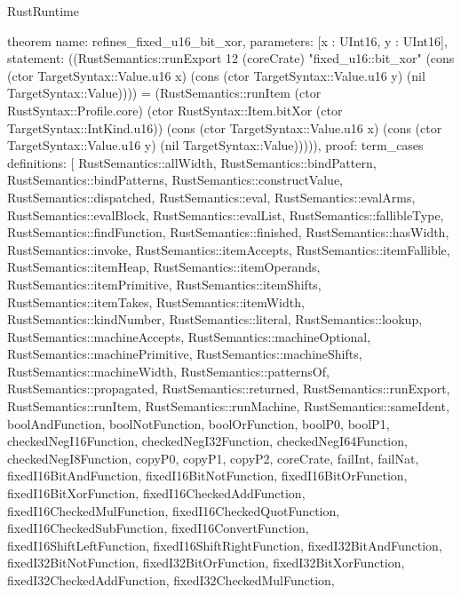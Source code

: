\begin{lexlean}{RustRuntime}
\begin{semanticmodule}
theorem{
  name: refines_fixed_u16_bit_xor,
  parameters: [x : UInt16, y : UInt16],
  statement: ((RustSemantics::runExport 12 (coreCrate) "fixed_u16::bit_xor" (cons (ctor TargetSyntax::Value.u16 x) (cons (ctor TargetSyntax::Value.u16 y) (nil TargetSyntax::Value)))) = (RustSemantics::runItem (ctor RustSyntax::Profile.core) (ctor RustSyntax::Item.bitXor (ctor TargetSyntax::IntKind.u16)) (cons (ctor TargetSyntax::Value.u16 x) (cons (ctor TargetSyntax::Value.u16 y) (nil TargetSyntax::Value))))),
  proof: term_cases{
    definitions: [
      RustSemantics::allWidth,
      RustSemantics::bindPattern,
      RustSemantics::bindPatterns,
      RustSemantics::constructValue,
      RustSemantics::dispatched,
      RustSemantics::eval,
      RustSemantics::evalArms,
      RustSemantics::evalBlock,
      RustSemantics::evalList,
      RustSemantics::fallibleType,
      RustSemantics::findFunction,
      RustSemantics::finished,
      RustSemantics::hasWidth,
      RustSemantics::invoke,
      RustSemantics::itemAccepts,
      RustSemantics::itemFallible,
      RustSemantics::itemHeap,
      RustSemantics::itemOperands,
      RustSemantics::itemPrimitive,
      RustSemantics::itemShifts,
      RustSemantics::itemTakes,
      RustSemantics::itemWidth,
      RustSemantics::kindNumber,
      RustSemantics::literal,
      RustSemantics::lookup,
      RustSemantics::machineAccepts,
      RustSemantics::machineOptional,
      RustSemantics::machinePrimitive,
      RustSemantics::machineShifts,
      RustSemantics::machineWidth,
      RustSemantics::patternsOf,
      RustSemantics::propagated,
      RustSemantics::returned,
      RustSemantics::runExport,
      RustSemantics::runItem,
      RustSemantics::runMachine,
      RustSemantics::sameIdent,
      boolAndFunction,
      boolNotFunction,
      boolOrFunction,
      boolP0,
      boolP1,
      checkedNegI16Function,
      checkedNegI32Function,
      checkedNegI64Function,
      checkedNegI8Function,
      copyP0,
      copyP1,
      copyP2,
      coreCrate,
      failInt,
      failNat,
      fixedI16BitAndFunction,
      fixedI16BitNotFunction,
      fixedI16BitOrFunction,
      fixedI16BitXorFunction,
      fixedI16CheckedAddFunction,
      fixedI16CheckedMulFunction,
      fixedI16CheckedQuotFunction,
      fixedI16CheckedSubFunction,
      fixedI16ConvertFunction,
      fixedI16ShiftLeftFunction,
      fixedI16ShiftRightFunction,
      fixedI32BitAndFunction,
      fixedI32BitNotFunction,
      fixedI32BitOrFunction,
      fixedI32BitXorFunction,
      fixedI32CheckedAddFunction,
      fixedI32CheckedMulFunction,
}}
\end{semanticmodule}
\end{lexlean}
